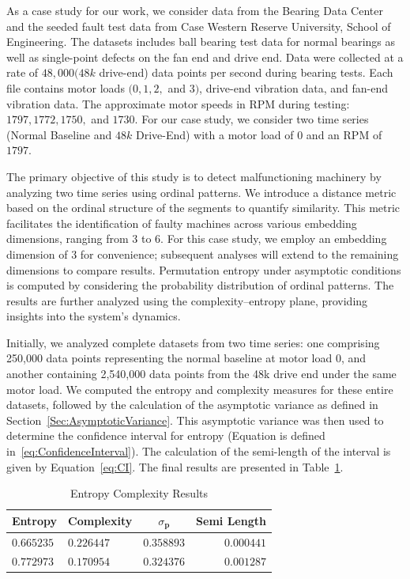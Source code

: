 As a case study for our work, we consider data from the Bearing Data Center and the seeded fault test data from Case Western Reserve University, School of Engineering. The datasets includes ball bearing test data for normal bearings as well as single-point defects on the fan end and drive end. Data were collected at a rate of $48,000 (48k$ drive-end) data points per second during bearing tests. Each file contains motor loads $(0, 1, 2,$ and $3)$, drive-end vibration data, and fan-end vibration data. The approximate motor speeds in RPM during testing: $1797, 1772, 1750,$ and $1730$. For our case study, we consider two time series (Normal Baseline and $48k$ Drive-End) with a motor load of $0$ and an RPM of $1797$. 

The primary objective of this study is to detect malfunctioning machinery by analyzing two time series using ordinal patterns. We introduce a distance metric based on the ordinal structure of the segments to quantify similarity. This metric facilitates the identification of faulty machines across various embedding dimensions, ranging from $3$ to $6$. For this case study, we employ an embedding dimension of $3$ for convenience; subsequent analyses will extend to the remaining dimensions to compare results. Permutation entropy under asymptotic conditions is computed by considering the probability distribution of ordinal patterns. The results are further analyzed using the complexity–entropy plane, providing insights into the system's dynamics.

Initially, we analyzed complete datasets from two time series: one comprising 250,000 data points representing the normal baseline at motor load 0, and another containing 2,540,000 data points from the 48k drive end under the same motor load. We computed the entropy and complexity measures for these entire datasets, followed by the calculation of the asymptotic variance as defined in Section~\ref{Sec:AsymptoticVariance}. This asymptotic variance was then used to determine the confidence interval for entropy (Equation is defined in~\ref{eq:ConfidenceInterval}). The calculation of the semi-length of the interval is given by Equation~\ref{eq:CI}. The final results are presented in Table~\ref{tab:EnComplexResults}.


\begin{table}[H]
	\centering
	\begin{tabular}{llcr}
		\toprule
		Entropy  & Complexity  & $\sigma_{\bm{p}}$ & Semi Length \\
		\midrule
		$0.665235$ & $0.226447$ & $0.358893$ & $0.000441$\\ 
		$0.772973$ & $0.170954$ & $0.324376$ & $0.001287$\\
		\bottomrule
	\end{tabular}
	\caption{Entropy Complexity Results}
	\label{tab:EnComplexResults}
\end{table}

